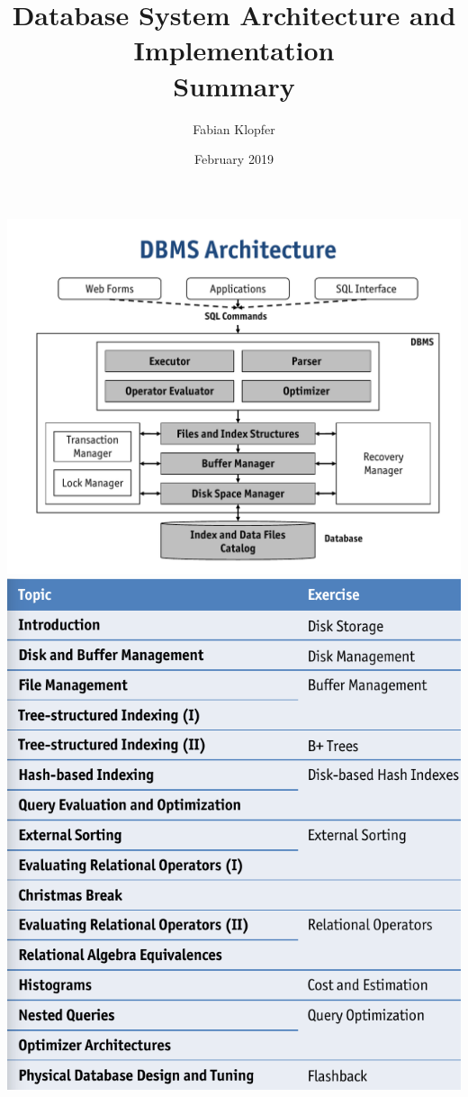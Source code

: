 \documentclass[a4paper]{report}
\title{Database System Architecture and Implementation \\
Summary}
\author{Fabian Klopfer}
\date{February 2019}
\begin{document}
\begin{onecolumn}

\begin{center}
    \includegraphics[width=.8\textwidth,height=0.4\textheight,keepaspectratio]{img/architecture_overview.png} \\
    \includegraphics[width=.8\textwidth,height=0.4\textheight,keepaspectratio]{img/topic_overview.png}\\
\end{center}
\end{onecolumn}
\tableofcontents
\newpage
\begin{twocolumn}




\end{twocolumn}
\end{document}
